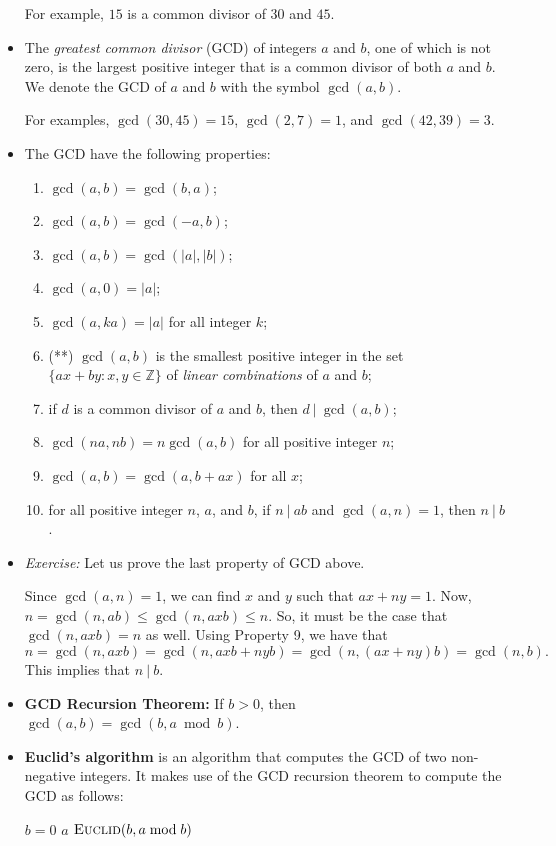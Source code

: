\documentclass{article}
\newcommand{\divides}{\ |\ }
\begin{document}
\begin{itemize}
For example, $15$ is a common divisor of $30$ and $45$.

\item The \emph{greatest common divisor} (GCD) of integers $a$ and $b$, one of which is not zero, is the largest positive integer that is a common divisor of both $a$ and $b$. We denote the GCD of $a$ and $b$ with the symbol $\gcd(a,b)$.

For examples, $\gcd(30,45) = 15$, $\gcd(2,7) = 1$, and $\gcd(42, 39) = 3$.

\item The GCD have the following properties:
\begin{enumerate}
\item $\gcd(a,b) = \gcd(b,a)$;
\item $\gcd(a,b) = \gcd(-a,b)$;
\item $\gcd(a,b) = \gcd(|a|, |b|)$;
\item $\gcd(a,0) = |a|$;
\item $\gcd(a,ka) = |a|$ for all integer $k$;
\item (**) $\gcd(a,b)$ is the smallest positive integer in the set $\{ax + by : x, y \in \mathbb{Z}\}$ of \emph{linear combinations} of $a$ and $b$;
\item if $d$ is a common divisor of $a$ and $b$, then $d \divides \gcd(a,b)$;
\item $\gcd(na, nb) = n \gcd(a,b)$ for all positive integer $n$;
\item $\gcd(a,b) = \gcd(a, b+ax)$ for all $x$;
\item for all positive integer $n$, $a$, and $b$, if $n \divides ab$ and $\gcd(a,n) = 1$, then $n \divides b$.
\end{enumerate}

\item {\it Exercise:} Let us prove the last property of GCD above.

Since $\gcd(a,n) = 1$, we can find $x$ and $y$ such that $ax + ny = 1$. Now, $n = \gcd(n, ab) \leq \gcd(n, axb) \leq n$. So, it must be the case that $\gcd(n,axb) = n$ as well. Using Property 9, we have that
$$n = \gcd(n, axb) = \gcd(n,axb + nyb) = \gcd(n, (ax + ny)b) = \gcd(n,b).$$ This implies that $n \divides b$.

\item {\bf GCD Recursion Theorem:} If $b > 0$, then $\gcd(a,b) = \gcd(b, a \bmod b)$.

\item {\bf Euclid's algorithm} is an algorithm that computes the GCD of two non-negative integers. It makes use of the GCD recursion theorem to compute the GCD as follows:
\begin{codebox}
\li \If $b = 0$
\li    \Then \Return $a$
\li    \Else \Return $\textnormal{\scshape Euclid}(b, a \bmod b)$
\end{codebox}


\end{itemize}
\end{document}

